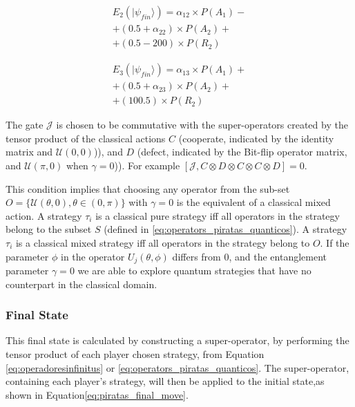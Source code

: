 \documentclass[10pt,twocolumn]{llncs}
\begin{document}
\begin{equation}
\begin{split}
E_{2}(\vert\psi_{fin}\rangle)=\alpha_{12}\times P(A_{1}) - \\
 + (0.5 + \alpha_{22})\times P(A_{2})  + \\ 
+(0.5-200)\times P(R_{2})
\end{split}
\label{eq:pirates_payoff32:2}
\end{equation}

\begin{equation}
\begin{split}
E_{3}(\vert\psi_{fin}\rangle)=\alpha_{13}\times P(A_{1}) + \\
 + (0.5 + \alpha_{23})\times P(A_{2})   + \\
 + (100.5)\times P(R_{2}) 
\end{split}
\label{eq:pirates_payoff32:3}
\end{equation}



The gate $\mathcal{J}$ is chosen to be commutative with the super-operators created by the tensor product of the classical actions $C$ (cooperate, indicated by the identity matrix and $\mathcal{U}(0,0)$)), and $D$ (defect, indicated by the Bit-flip operator matrix, and $\mathcal{U}(\pi,0)$ when $\gamma = 0$)). For example $[ \mathcal{J} , C \otimes D \otimes C \otimes C \otimes D ] = 0 $.


This condition implies that choosing any operator from the sub-set $O = \{ \mathcal{U} ( \theta , 0) , \theta \in (0, \pi) \}$ with $\gamma = 0$ is the equivalent of a classical mixed action. A strategy $\tau_{i}$ is a classical pure strategy iff all operators in the strategy belong to the subset $S$ (defined in \eqref{eq:operators_piratas_quanticos}). A strategy $\tau_{i}$ is a classical mixed strategy iff all operators in the strategy belong to $O$.
If the parameter $\phi$ in the operator $U_{j}(\theta ,\phi)$ differs from $0$, and the entanglement parameter $\gamma = 0$ we are able to explore quantum strategies that have no counterpart in the classical domain\cite{Eisert2008}.


\subsubsection{Final State}
\label{subsec:pirates_finalstate}


This final state is calculated by constructing a super-operator, by performing the tensor product of each player chosen strategy, from Equation \eqref{eq:operadoresinfinitus} or \eqref{eq:operators_piratas_quanticos}. The super-operator, containing each player's strategy, will then be applied to the initial state,as shown in Equation\eqref{eq:piratas_final_move}.
\end{document}
